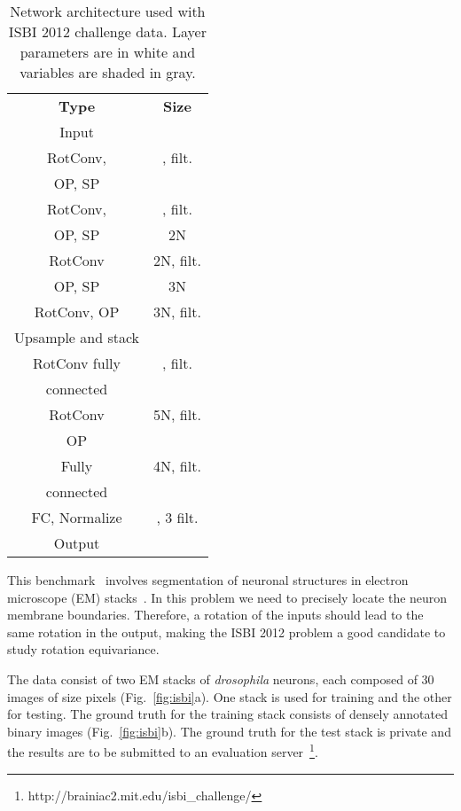 \documentclass[10pt,twocolumn,letterpaper,table]{article}
\begin{document}
\begin{table}[b]
\vspace*{-3mm}
  \centering
{
\footnotesize
\begin{tabular}{|c|c|}
	\hline \textbf{Type} & \textbf{Size}\\ 
	\rowcolor{lightgray}
	\hline Input & \\
	\hline RotConv, & ,  filt.\\ \cline{2-2}
    OP,  SP     &   \cellcolor{lightgray} \\ 
	\hline RotConv, & ,  filt.\\ \cline{2-2}
	OP,  SP     &  2N \cellcolor{lightgray} \\ 
	\hline RotConv & 2N,  filt.\\ \cline{2-2}
	OP,  SP  & 3N \cellcolor{lightgray} \\ 
	\hline RotConv, OP  & 3N,  filt. \\
	Upsample and stack &  \cellcolor{lightgray}\\
    \hline RotConv fully & ,  filt.\\
	connected &  \cellcolor{lightgray}\\
    \hline RotConv  & 5N,  filt. \\
	OP &  \cellcolor{lightgray}\\
    \hline Fully   & 4N,  filt. \\
	connected &  \cellcolor{lightgray}\\
	\hline FC, Normalize & , 3 filt.\\
	\rowcolor{lightgray}
	\hline Output &  \\
	\hline 
\end{tabular} 
}
\vspace{0.15cm}
\caption{Network architecture used with ISBI 2012 challenge data. Layer parameters are in white and variables are shaded in gray.}
\label{tab:isbi_arch}
\vspace*{-4mm}
\end{table}

This benchmark~\cite{arganda2015crowdsourcing} involves segmentation of neuronal structures in electron microscope (EM) stacks~\cite{cardona2010integrated}. In this problem we need to precisely locate the neuron membrane boundaries. Therefore, a rotation of the inputs should lead to the same rotation in the output, making the ISBI 2012 problem a good candidate to study rotation equivariance.

The data consist of two EM stacks of \textit{drosophila} neurons, each composed of 30 images of size  pixels (Fig.~\ref{fig:isbi}a). One stack is used for training and the other for testing. The ground truth for the training stack consists of densely annotated binary images (Fig.~\ref{fig:isbi}b). The ground truth for the test stack is private and the results are to be submitted to an evaluation server~\footnote{\label{web:isbi}http://brainiac2.mit.edu/isbi\_challenge/}.
\end{document}
